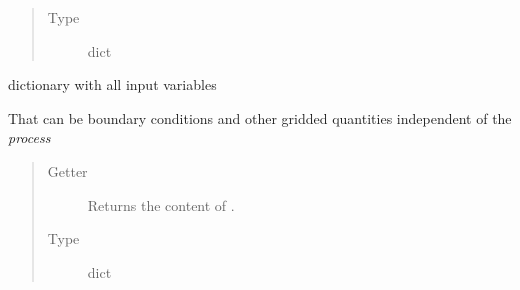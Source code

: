\documentclass[letterpaper,10pt,english]{sphinxmanual}
\begin{document}
\begin{fulllineitems}
\begin{fulllineitems}
\begin{quote}
\begin{description}
\item[{Type}] \leavevmode
dict

\end{description}\end{quote}

\end{fulllineitems}


\begin{fulllineitems}
\label{api/climlab.process:climlab.process.process.Process.input}
dictionary with all input variables

That can be boundary conditions and other gridded quantities 
independent of the \emph{process}
\begin{quote}\begin{description}
\item[{Getter}] \leavevmode
Returns the content of .

\item[{Type}] \leavevmode
dict

\end{description}\end{quote}

\end{fulllineitems}


\begin{fulllineitems}
\label{api/climlab.process:climlab.process.process.Process.lat}
\end{fulllineitems}


\begin{fulllineitems}
\label{api/climlab.process:climlab.process.process.Process.lat_bounds}
\end{fulllineitems}


\begin{fulllineitems}
\label{api/climlab.process:climlab.process.process.Process.lev}
\end{fulllineitems}



\end{fulllineitems}
\end{document}
